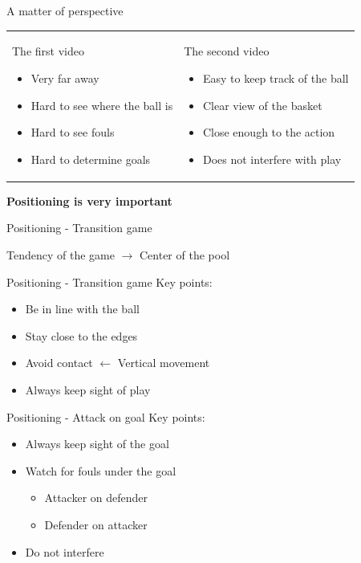 \documentclass{beamer}
\begin{document}
	\begin{frame}{A matter of perspective}
		\begin{tabular}{ll}
			\parbox{0.5\linewidth}{
				The first video
				\begin{itemize}
					\item Very far away
					\item Hard to see where the ball is
					\item Hard to see fouls
					\item Hard to determine goals
				\end{itemize}
				\pause
			}
			&
			\parbox{0.5\linewidth}{
				The second video
				\begin{itemize}
					\item Easy to keep track of the ball
					\item Clear view of the basket
					\item Close enough to the action
					\item Does not interfere with play
				\end{itemize}
			}
		\end{tabular}
		\pause
		\begin{center}
			\textbf{Positioning is very important}
		\end{center}
	\end{frame}

	\begin{frame}{Positioning - Transition game}
		\begin{center}
			Tendency of the game $\rightarrow$ Center of the pool
		\end{center}
	\end{frame}

	\begin{frame}{Positioning - Transition game}
		Key points:
		\begin{itemize}
			\item Be in line with the ball
			\item Stay close to the edges
			\item Avoid contact $\leftarrow$ Vertical movement
			\item Always keep sight of play
		\end{itemize}
	\end{frame}

	\begin{frame}{Positioning - Attack on goal}
		Key points:
		\begin{itemize}
			\item Always keep sight of the goal
			\item Watch for fouls under the goal
			\begin{itemize}
				\item Attacker on defender
				\item Defender on attacker
			\end{itemize}
			\item Do not interfere
		\end{itemize}
	\end{frame}
\end{document}

